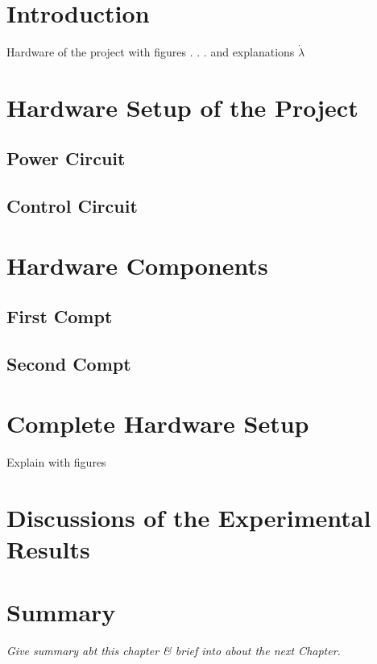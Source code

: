 \documentclass[12 pt, oneside]{book}
\begin{document}
\section{Introduction}

Hardware of the project with figures . . . and explanations  $\dot \lambda$


\section{Hardware Setup of the Project}

\subsection {Power Circuit}


\subsection {Control Circuit}


\section{Hardware Components}

\subsection {First Compt}

\subsection {Second Compt}



\section{Complete Hardware Setup}

Explain with figures

\section{Discussions of the Experimental Results}

\section{Summary}

{\em Give summary abt this chapter \& brief into about the next Chapter.}
\end{document}
